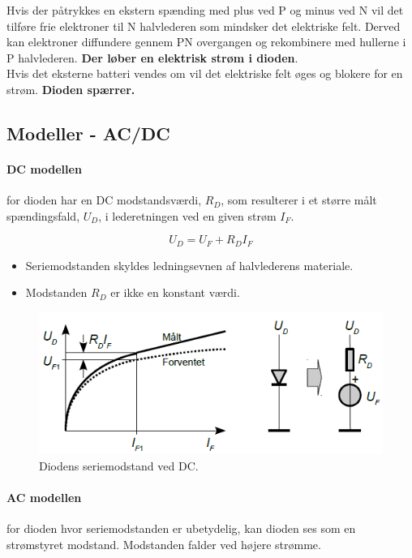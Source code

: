 \documentclass[danish]{article}
\begin{document}
Hvis der påtrykkes en ekstern spænding med plus ved P og minus ved N vil det tilføre frie elektroner til N halvlederen som mindsker det elektriske felt.
Derved kan elektroner diffundere gennem PN overgangen og rekombinere med hullerne i P halvlederen. \textbf{Der løber en elektrisk strøm i dioden}. \\

Hvis det eksterne batteri vendes om vil det elektriske felt øges og blokere for en strøm. \textbf{Dioden spærrer.}


\subsection{Modeller - AC/DC}
\paragraph{DC modellen} for dioden har en DC modstandsværdi, $R_D$, som resulterer i et større målt spændingsfald, $U_D$, i lederetningen ved en given strøm $I_F$.

\begin{equation}
U_D = U_F + R_D I_F
\end{equation}

\begin{itemize}
	\item Seriemodstanden skyldes ledningsevnen af halvlederens materiale.
	\item Modstanden $R_D$ er ikke en konstant værdi.
\end{itemize}

\begin{figure} [H]
	\centering
	\includegraphics[width=0.9\linewidth]{graphics/DC_diode}
	\caption{Diodens seriemodstand ved DC.}
	\label{fig:DC_diode}
\end{figure}

\newpage
\paragraph{AC modellen} for dioden hvor seriemodstanden er ubetydelig, kan dioden ses som en strømstyret modstand. 
Modstanden falder ved højere strømme.
\end{document}
